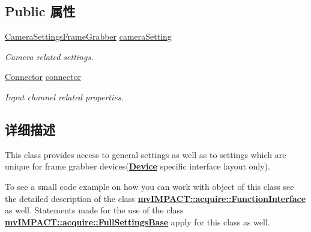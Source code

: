 \subsection*{Public 属性}
\begin{DoxyCompactItemize}
\item 
\hypertarget{classmv_i_m_p_a_c_t_1_1acquire_1_1_settings_frame_grabber_ac98704aadb1cd9e2fcc025daf06fd95a}{\hyperlink{classmv_i_m_p_a_c_t_1_1acquire_1_1_camera_settings_frame_grabber}{Camera\+Settings\+Frame\+Grabber} \hyperlink{classmv_i_m_p_a_c_t_1_1acquire_1_1_settings_frame_grabber_ac98704aadb1cd9e2fcc025daf06fd95a}{camera\+Setting}}\label{classmv_i_m_p_a_c_t_1_1acquire_1_1_settings_frame_grabber_ac98704aadb1cd9e2fcc025daf06fd95a}

\begin{DoxyCompactList}\small\item\em Camera related settings. \end{DoxyCompactList}\item 
\hypertarget{classmv_i_m_p_a_c_t_1_1acquire_1_1_settings_frame_grabber_a4d0213a7d4640d9b7b6cfd8c05569586}{\hyperlink{classmv_i_m_p_a_c_t_1_1acquire_1_1_connector}{Connector} \hyperlink{classmv_i_m_p_a_c_t_1_1acquire_1_1_settings_frame_grabber_a4d0213a7d4640d9b7b6cfd8c05569586}{connector}}\label{classmv_i_m_p_a_c_t_1_1acquire_1_1_settings_frame_grabber_a4d0213a7d4640d9b7b6cfd8c05569586}

\begin{DoxyCompactList}\small\item\em Input channel related properties. \end{DoxyCompactList}\end{DoxyCompactItemize}


\subsection{详细描述}
This class provides access to general settings as well as to settings which are unique for frame grabber devices({\bfseries \hyperlink{classmv_i_m_p_a_c_t_1_1acquire_1_1_device}{Device}} specific interface layout only). 

To see a small code example on how you can work with object of this class see the detailed description of the class {\bfseries \hyperlink{classmv_i_m_p_a_c_t_1_1acquire_1_1_function_interface}{mv\+I\+M\+P\+A\+C\+T\+::acquire\+::\+Function\+Interface}} as well. Statements made for the use of the class {\bfseries \hyperlink{classmv_i_m_p_a_c_t_1_1acquire_1_1_full_settings_base}{mv\+I\+M\+P\+A\+C\+T\+::acquire\+::\+Full\+Settings\+Base}} apply for this class as well.

